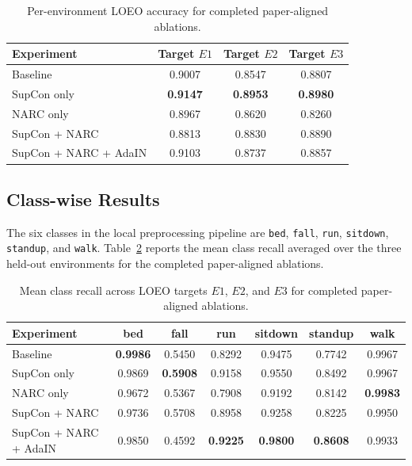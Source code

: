 \documentclass[11pt]{article}
\begin{document}
\begin{table}[H]
\centering
\caption{Per-environment LOEO accuracy for completed paper-aligned ablations.}
\label{tab:perenv}
\begin{tabular}{lccc}
\toprule
Experiment & Target $E1$ & Target $E2$ & Target $E3$ \\
\midrule
Baseline & 0.9007 & 0.8547 & 0.8807 \\
SupCon only & \textbf{0.9147} & \textbf{0.8953} & \textbf{0.8980} \\
NARC only & 0.8967 & 0.8620 & 0.8260 \\
SupCon + NARC & 0.8813 & 0.8830 & 0.8890 \\
SupCon + NARC + AdaIN & 0.9103 & 0.8737 & 0.8857 \\
\bottomrule
\end{tabular}
\end{table}

\subsection{Class-wise Results}
The six classes in the local preprocessing pipeline are \texttt{bed}, \texttt{fall}, \texttt{run}, \texttt{sitdown}, \texttt{standup}, and \texttt{walk}. Table~\ref{tab:classrecall} reports the mean class recall averaged over the three held-out environments for the completed paper-aligned ablations.

\begin{table}[H]
\centering
\small
\caption{Mean class recall across LOEO targets $E1$, $E2$, and $E3$ for completed paper-aligned ablations.}
\label{tab:classrecall}
\begin{tabular}{lcccccc}
\toprule
Experiment & bed & fall & run & sitdown & standup & walk \\
\midrule
Baseline & \textbf{0.9986} & 0.5450 & 0.8292 & 0.9475 & 0.7742 & 0.9967 \\
SupCon only & 0.9869 & \textbf{0.5908} & 0.9158 & 0.9550 & 0.8492 & 0.9967 \\
NARC only & 0.9672 & 0.5367 & 0.7908 & 0.9192 & 0.8142 & \textbf{0.9983} \\
SupCon + NARC & 0.9736 & 0.5708 & 0.8958 & 0.9258 & 0.8225 & 0.9950 \\
SupCon + NARC + AdaIN & 0.9850 & 0.4592 & \textbf{0.9225} & \textbf{0.9800} & \textbf{0.8608} & 0.9933 \\
\bottomrule
\end{tabular}
\end{table}
\end{document}
